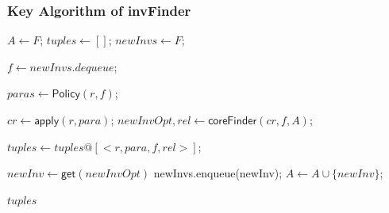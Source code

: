 \documentclass{beamer}
\newcommand{\forget}[1]{}
\begin{document}
\begin{frame}\frametitle{Key Algorithm of {\sf invFinder}}
\forget{
\begin{algorithm}\label{alg:invFinder}

\caption{Algorithm: $invFinder$}\label{alg:invfinder}

\KwIn{  Initially given invariants $F$, a protocol $\mathcal{P}=<I,R>$ }

\KwOut{A set of tuples which represent causal relations between concrete rules and invariants: }

{
    $A\leftarrow F$;

    $tuples \leftarrow []$;

    $newInvs \leftarrow F$;

    \While{$newInvs$ is not empty}
    {
   $ f \leftarrow newInvs.dequeue$;

   \For {$r \in R$}
   { $paras \leftarrow \mathsf{Policy}(r,f)$;

      \For {$para \in paras$}
     {$cr \leftarrow \mathsf{apply}(r,para)$;

       $newInvOpt,rel \leftarrow \mathsf{coreFinder}(cr,  f, A)$;

        $tuples \leftarrow tuples @[<r, para, f, rel>]$;

       \If{$newInvOpt \neq NONE$}
        {$newInv \leftarrow \mathsf{get}(newInvOpt)$\;
         newInvs.enqueue(newInv)\;
        $A \leftarrow A \cup \{newInv\}$\;
        }

     }
   }
  }
}
\Return $tuples$\;


\end{algorithm}
}

\begin{algorithm}[H]




$A\leftarrow F$; $tuples \leftarrow []$; $newInvs \leftarrow F$;

{
   $ f \leftarrow newInvs.dequeue$;

   {
        $paras \leftarrow \mathsf{Policy}(r,f)$;

        {
            $cr \leftarrow \mathsf{apply}(r,para)$; $newInvOpt,rel \leftarrow \mathsf{coreFinder}(cr,  f, A)$;

            $tuples \leftarrow tuples @[<r, para, f, rel>]$;

            {
                $newInv \leftarrow \mathsf{get}(newInvOpt)$\;
                newInvs.enqueue(newInv); $A \leftarrow A \cup \{newInv\}$;
            }
        }
   }

}
\Return $tuples$\;
\end{algorithm}


 \end{frame}
\end{document}
